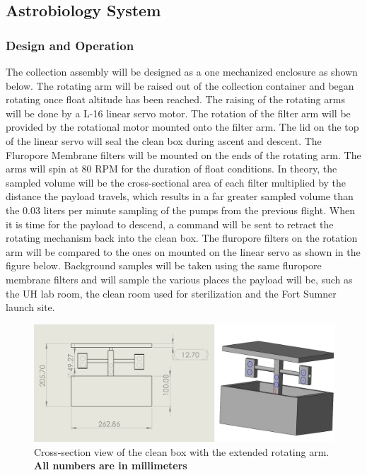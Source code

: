 \subsection{Astrobiology System}
\label{sec:AstrobiologySystem}

\subsubsection{Design and Operation}
The collection assembly will be designed as a one mechanized enclosure as shown below. The rotating arm will be raised out of the collection container and began rotating once float altitude has been reached. The raising of the rotating arms will be done by a L-16 linear servo motor. The rotation of the filter arm will be provided by the rotational motor mounted onto the filter arm. The lid on the top of the linear servo will seal the clean box during ascent and descent. The  Fluropore Membrane filters will be mounted on the ends of the rotating arm. The arms will spin at 80 RPM for the duration of float conditions. In theory, the sampled volume will be the cross-sectional area of each filter multiplied by the distance the payload travels, which results in a far greater sampled volume than the 0.03 liters per minute sampling of the pumps from the previous flight.\cite{SORA2} When it is time for the payload to descend, a command will be sent to retract the rotating mechanism back into the clean box. The fluropore filters on the rotation arm will be compared to the ones on mounted on the linear servo as shown in the figure below. Background samples will be taken using the same fluropore membrane filters and will sample the various places the payload will be, such as the UH lab room, the clean room used for sterilization and the Fort Sumner launch site. 

\begin{figure}[!h] 
	\begin{center}
		\includegraphics[width=\linewidth]{Figures/T-Arm.jpg}
		\caption{Cross-section view of the clean box with the extended rotating arm. \bf All numbers are in millimeters}
		\label{fig:AstroBox}
	\end{center}
\end{figure} 
